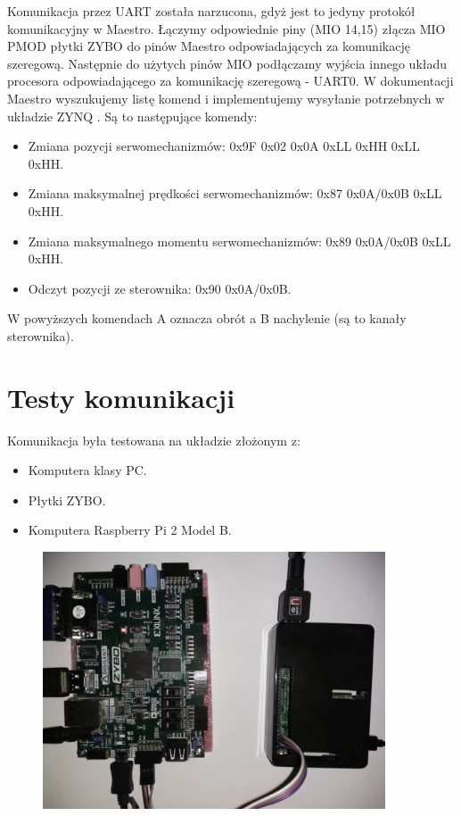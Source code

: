 Komunikacja przez UART została narzucona, gdyż jest to jedyny protokół komunikacyjny w Maestro. Łączymy odpowiednie piny (MIO 14,15) złącza MIO PMOD płytki ZYBO do pinów Maestro odpowiadających za komunikację szeregową. Następnie do użytych pinów MIO podłączamy wyjścia innego układu procesora odpowiadającego za komunikację szeregową - UART0. W dokumentacji Maestro wyszukujemy listę komend i implementujemy wysyłanie potrzebnych w układzie ZYNQ \cite{MM}. Są to następujące komendy:
\begin{itemize}
\item Zmiana pozycji serwomechanizmów: 0x9F 0x02 0x0A 0xLL 0xHH 0xLL 0xHH.
\item Zmiana maksymalnej prędkości serwomechanizmów: 0x87 0x0A/0x0B 0xLL 0xHH.
\item Zmiana maksymalnego momentu serwomechanizmów: 0x89 0x0A/0x0B 0xLL 0xHH.
\item Odczyt pozycji ze sterownika: 0x90 0x0A/0x0B.
\end{itemize}
W powyższych komendach A oznacza obrót a B nachylenie (są to kanały sterownika).

\section{Testy komunikacji}
\label{testy_komunikacji}
Komunikacja była testowana na układzie złożonym z:
\begin{itemize}
\item Komputera klasy PC.
\item Płytki ZYBO.
\item Komputera Raspberry Pi 2 Model B.
\end{itemize}

\begin{figure}[h]
	\centering
	\includegraphics[width=4in]{raspberry.jpg}
\end{figure}

